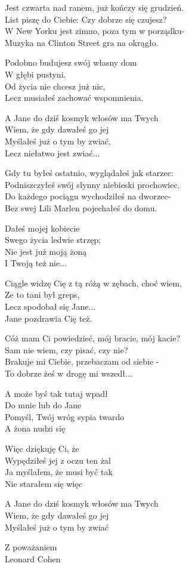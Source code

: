 \begin{text}
    Jest czwarta nad ranem, już kończy się grudzień.\\
    List piszę do Ciebie: Czy dobrze się czujesz?\\
    W New Yorku jest zimno, poza tym w porządku-\\
    Muzyka na Clinton Street gra na okrągło.

    Podobno budujesz swój własny dom\\
    W głębi pustyni.\\
    Od życia nie chcesz już nic,\\
    Lecz musiałeś zachować wspomnienia.

    A Jane do dziś kosmyk włosów ma Twych\\
    Wiem, że gdy dawałeś go jej\\
    Myślałeś już o tym by zwiać,\\
    Lecz niełatwo jest zwiać...

    Gdy tu byłeś ostatnio, wyglądałeś jak starzec:\\
    Podniszczyłeś swój słynny niebieski prochowiec.\\
    Do każdego pociągu wychodziłeś na dworzec-\\
    Bez swej Lili Marlen pojechałeś do domu.

    Dałeś mojej kobiecie\\
    Swego życia ledwie strzęp;\\
    Nie jest już moją żoną\\
    I Twoją też nie...

    Ciągle widzę Cię z tą różą w zębach, choć wiem,\\
    Ze to tani był greps,\\
    Lecz spodobał się Jane...\\
    Jane pozdrawia Cię też.

    Cóż mam Ci powiedzieć, mój bracie, mój kacie?\\
    Sam nie wiem, czy pisać, czy nie?\\
    Brakuje mi Ciebie, przebaczam od siebie -\\
    To dobrze żeś w drogę mi wszedł...

    A może byś tak tutaj wpadł\\
    Do mnie lub do Jane\\
    Pomyśl, Twój wróg sypia twardo\\
    A żona nudzi się

    Więc dziękuję Ci, że\\
    Wypędziłeś jej z oczu ten żal\\
    Ja myślałem, że musi być tak\\
    Nie starałem się więc

    A Jane do dziś kosmyk włosów ma Twych\\
    Wiem, że gdy dawałeś go jej\\
    Myślałeś już o tym by zwiać

    Z poważaniem\\
    Leonard Cohen
\end{text}
\begin{chord}

\end{chord}